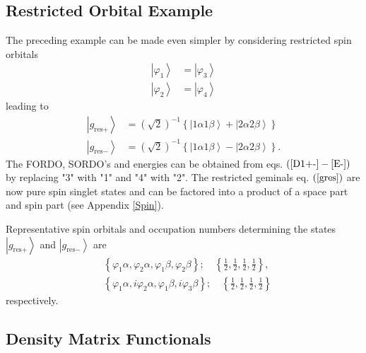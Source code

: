 \documentclass[aps,preprint]{revtex4}%
\begin{document}
\subsection{Restricted Orbital Example}

The preceding example can be made even simpler by considering restricted spin
orbitals
\begin{align}
\left\vert \varphi_{1}\right\rangle  &  =\left\vert \varphi_{3}\right\rangle
\nonumber\\
\left\vert \varphi_{2}\right\rangle  &  =\left\vert \varphi_{4}\right\rangle
\end{align}
leading to
\begin{align}
\left\vert g_{\text{res}+}\right\rangle  &  =\left(  \sqrt{2}\right)
^{-1}\left\{  \left\vert 1\alpha1\beta\right\rangle +\left\vert 2\alpha
2\beta\right\rangle \right\} \nonumber\\
\left\vert g_{\text{res}-}\right\rangle  &  =\left(  \sqrt{2}\right)
^{-1}\left\{  \left\vert 1\alpha1\beta\right\rangle -\left\vert 2\alpha
2\beta\right\rangle \right\}  . \label{gres}%
\end{align}
The FORDO, SORDO's and energies can be obtained from eqs. $\left(
\ref{D1+-}-\ref{E-}\right)  $ by replacing "3" with "1" and "4" with "2". The
restricted geminals eq. $\left(  \ref{gres}\right)  $ are now pure spin
singlet states and can be factored into a product of a space part and spin
part (see Appendix \ref{Spin}).

Representative spin orbitals and occupation numbers determining the states
$\left\vert g_{\text{res}+}\right\rangle $ and $\left\vert g_{\text{res}%
-}\right\rangle $ are
\begin{align}
&  \left\{  \varphi_{1}\alpha,\varphi_{2}\alpha,\varphi_{1}\beta,\varphi
_{2}\beta\right\}  ;\quad\left\{  \frac{1}{2},\frac{1}{2},\frac{1}{2},\frac
{1}{2}\right\}  ,\\
&  \left\{  \varphi_{1}\alpha,i\varphi_{2}\alpha,\varphi_{1}\beta,i\varphi
_{3}\beta\right\}  ;\quad\left\{  \frac{1}{2},\frac{1}{2},\frac{1}{2},\frac
{1}{2}\right\}
\end{align}
respectively.

\subsection{Density Matrix Functionals\label{DMFEx}}
\end{document}
